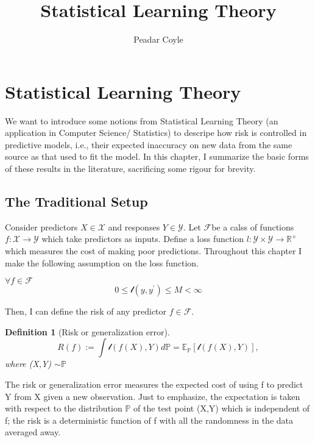 \documentclass{article}
\title{Statistical Learning Theory}
\author{Peadar Coyle}
\def\cX{\ensuremath{\mathcal{X}}}
\def\cY{\ensuremath{\mathcal{Y}}}
\def\cF{\ensuremath{\mathcal{F}}}
\theoremstyle{plain}
\newtheorem{definition}[theorem]{Definition}
\begin{document}
\renewcommand{\baselinestretch}{1.5}

\maketitle
\section{Statistical Learning Theory}
We want to introduce some notions from Statistical Learning Theory (an application in Computer Science/ Statistics) to descripe how 
risk is controlled in predictive models, i.e., their expected inaccuracy on new data from the same source as that used to fit the model. 
In this chapter, I summarize the basic forms of these results in the literature, sacrificing some rigour for brevity. 
\subsection{The Traditional Setup}
Consider predictors $X \in \mathcal{X}$ and responses $Y \in \mathcal{Y}$. Let \cF be a calss of functions $f:\cX \rightarrow \cY$ which take predictors as inputs. 
   Define a loss function $l: \cY \times \cY \rightarrow \mathbb{R}^{+}$ which measures the cost of making poor predictions. 
 Throughout this chapter I make the following assumption on the loss function. 
 \begin{assumption}
 $\forall f \in \cF$
 \begin{equation*}
 0 \leq \mathcal{l}(y,y^{'}) \leq M \lt \infty
 \end{equation*}
 \end{assumption}
 Then, I can define the risk of any predictor $f \in \cF$. 
 \begin{definition}[Risk or generalization error]
 \begin{equation}
R(f):= \int \mathcal{l}(f(X),Y) d\mathbb{P} = \mathbb{E}_{\mathbb{P}}[\mathcal{l}(f(X),Y)], \end{equation}
where (X,Y) $\sim \mathbb{P}$
 \end{definition}
 The risk or generalization error measures the expected cost of using f to predict Y from X given a new observation. 
 Just to emphasize, the expectation is taken with respect to the distribution $\mathbb{P}$ of the test point (X,Y) which is
 independent of f; the risk is a deterministic function of f with all the randomness in the data averaged away. 
\end{document}

